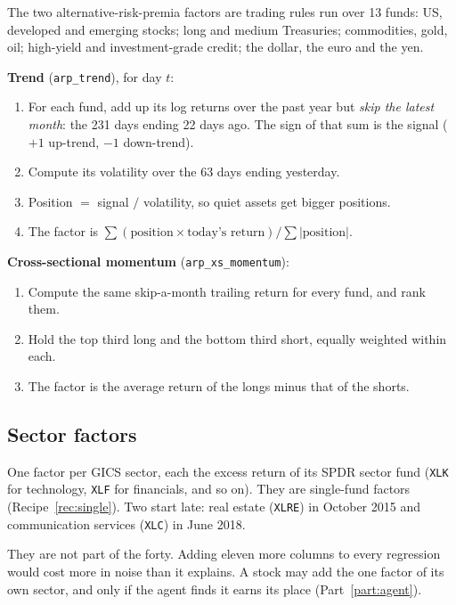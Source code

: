 \documentclass[11pt,a4paper]{article}
\newcommand{\fid}[1]{\texttt{#1}}
\begin{document}
The two alternative-risk-premia factors are trading rules run over 13 funds: US,
developed and emerging stocks; long and medium Treasuries; commodities, gold, oil;
high-yield and investment-grade credit; the dollar, the euro and the yen.

\begin{method}
\textbf{Trend} (\fid{arp\_trend}), for day $t$:
\begin{enumerate}[leftmargin=1.4em]
  \item For each fund, add up its log returns over the past year but \emph{skip the latest month}: the 231 days ending 22 days ago. The sign of that sum is the signal ($+1$ up-trend, $-1$ down-trend).
  \item Compute its volatility over the 63 days ending yesterday.
  \item Position $=$ signal $/$ volatility, so quiet assets get bigger positions.
  \item The factor is $\sum(\text{position}\times\text{today's return}) / \sum|\text{position}|$.
\end{enumerate}
\textbf{Cross-sectional momentum} (\fid{arp\_xs\_momentum}):
\begin{enumerate}[leftmargin=1.4em]
  \item Compute the same skip-a-month trailing return for every fund, and rank them.
  \item Hold the top third long and the bottom third short, equally weighted within each.
  \item The factor is the average return of the longs minus that of the shorts.
\end{enumerate}
\end{method}

\subsection{Sector factors}

\begin{method}
One factor per GICS sector, each the excess return of its SPDR sector fund
(\texttt{XLK} for technology, \texttt{XLF} for financials, and so on). They are
single-fund factors (Recipe~\ref{rec:single}). Two start late: real estate
(\texttt{XLRE}) in October 2015 and communication services (\texttt{XLC}) in June 2018.
\end{method}

They are not part of the forty. Adding eleven more columns to every regression would
cost more in noise than it explains. A stock may add the one factor of its own
sector, and only if the agent finds it earns its place (Part~\ref{part:agent}).
\end{document}
